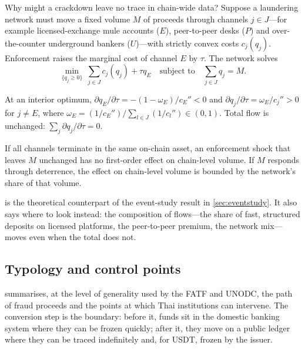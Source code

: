Why might a crackdown leave no trace in chain-wide data? Suppose a laundering network must move a fixed volume $M$ of
proceeds through channels $j\in J$---for example licensed-exchange mule accounts ($E$), peer-to-peer desks ($P$) and
over-the-counter underground bankers ($U$)---with strictly convex costs $c_j(q_j)$. Enforcement raises the marginal
cost of channel $E$ by $\tau$. The network solves
\begin{equation}\label{eq:channels}
\min_{\{q_j\geq0\}}\ \sum_{j\in J}c_j(q_j)+\tau q_E\quad\text{subject to}\quad\sum_{j\in J}q_j=M .
\end{equation}

\begin{proposition}[Displacement]\label{prop:displacement}
At an interior optimum, $\partial q_E/\partial\tau=-(1-\omega_E)/c_E''<0$ and $\partial q_j/\partial\tau=\omega_E/c_j''>0$
for $j\neq E$, where $\omega_E=(1/c_E'')/\sum_{l\in J}(1/c_l'')\in(0,1)$. Total flow is unchanged:
$\sum_j\partial q_j/\partial\tau=0$.
\end{proposition}

\begin{corollary}\label{cor:invisible}
If all channels terminate in the same on-chain asset, an enforcement shock that leaves $M$ unchanged has no first-order
effect on chain-level volume. If $M$ responds through deterrence, the effect on chain-level volume is bounded by the
network's share of that volume.
\end{corollary}

 is the theoretical counterpart of the event-study result in \cref{sec:eventstudy}. It also says
where to look instead: the composition of flows---the share of fast, structured deposits on licensed platforms, the
peer-to-peer premium, the network mix---moves even when the total does not.

\subsection{Typology and control points}\label{sec:typology}

 summarises, at the level of generality used by the FATF and UNODC, the path of fraud proceeds and
the points at which Thai institutions can intervene. The conversion step is the boundary: before it, funds sit in the
domestic banking system where they can be frozen quickly; after it, they move on a public ledger where they can be
traced indefinitely and, for USDT, frozen by the issuer.

